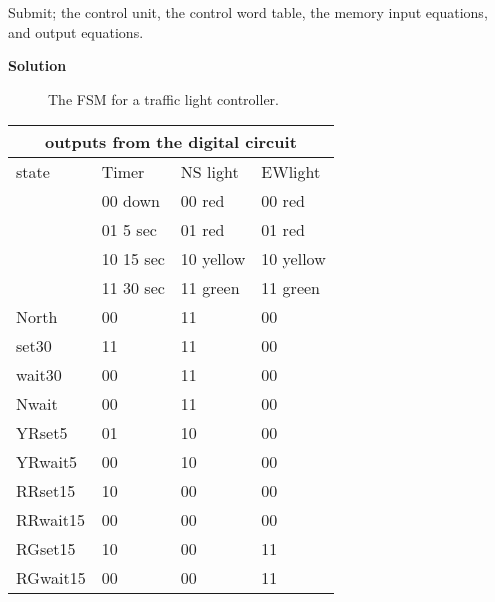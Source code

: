 \begin{enumerate}
        Submit;
        the control unit,
        the control word table,
        the memory input equations, and
        output equations.
        \newpage
        \begin{onlysolution}  \textbf{Solution} \itshape{

                \begin{figure}[ht]
                    \caption{The FSM for a traffic light controller.}
                \end{figure}

                \begin{tabular}{|l|||l|l|l|} \hline
                    \multicolumn{4}{|c|}{outputs from the digital circuit}    \\ \hline \hline
                    state & Timer     & NS light  & EWlight     \\ \hline
                    & 00 down   & 00 red    & 00 red      \\ \hline
                    & 01 5 sec  & 01 red    & 01 red      \\ \hline
                    & 10 15 sec & 10 yellow & 10 yellow   \\ \hline
                    & 11 30 sec & 11 green  & 11 green    \\ \hline \hline
                    North    & 00       & 11          & 00  \\ \hline
                    set30 & 11       & 11          & 00  \\ \hline
                    wait30& 00       & 11          & 00  \\ \hline
                    Nwait    & 00       & 11          & 00  \\ \hline

                    YRset5  & 01       & 10          & 00  \\ \hline
                    YRwait5 & 00       & 10          & 00  \\ \hline

                    RRset15 & 10       & 00          & 00  \\ \hline
                    RRwait15& 00       & 00          & 00  \\ \hline

                    RGset15 & 10       & 00          & 11  \\ \hline
                    RGwait15& 00       & 00          & 11  \\ \hline
                \end{tabular}

}
\end{onlysolution}
\end{enumerate}

